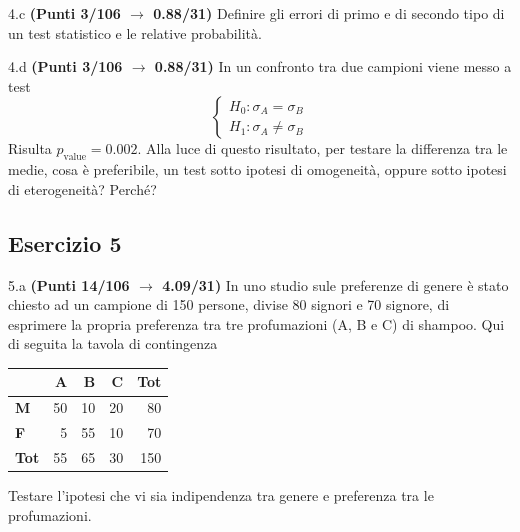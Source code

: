 \documentclass[
  11pt,
]{book}
\theoremstyle{mytheoremstyle}
\theoremstyle{mydefstyle}
\begin{document}
4.c \textbf{(Punti 3/106 \(\rightarrow\) 0.88/31)} Definire gli errori di primo e di secondo
tipo di un test statistico e le relative probabilità.

4.d \textbf{(Punti 3/106 \(\rightarrow\) 0.88/31)} In un confronto tra due campioni viene messo a test
\[
\begin{cases}
H_0:\sigma_A=\sigma_B\\
H_1:\sigma_A\ne \sigma_B
\end{cases}
\]
Risulta \(p_\text{value}=0.002\). Alla luce di questo risultato, per testare la differenza tra le medie, cosa è preferibile, un test sotto ipotesi di omogeneità, oppure sotto ipotesi di eterogeneità? Perché?

\subsection{Esercizio 5}\label{esercizio-5-14}

5.a \textbf{(Punti 14/106 \(\rightarrow\) 4.09/31)} In uno studio sule preferenze di genere è stato chiesto ad un campione di 150 persone,
divise 80 signori e 70 signore, di esprimere la propria preferenza tra tre profumazioni (A, B e C)
di shampoo.
Qui di seguita la tavola di contingenza

\begin{table}[H]
\centering
\begin{tabular}{>{}lrrrr}
\toprule
  & A & B & C & Tot\\
\midrule
\textbf{M} & 50 & 10 & 20 & 80\\
\textbf{F} & 5 & 55 & 10 & 70\\
\textbf{Tot} & 55 & 65 & 30 & 150\\
\bottomrule
\end{tabular}
\end{table}

Testare l'ipotesi che vi sia indipendenza tra genere e preferenza tra le profumazioni.
\end{document}
